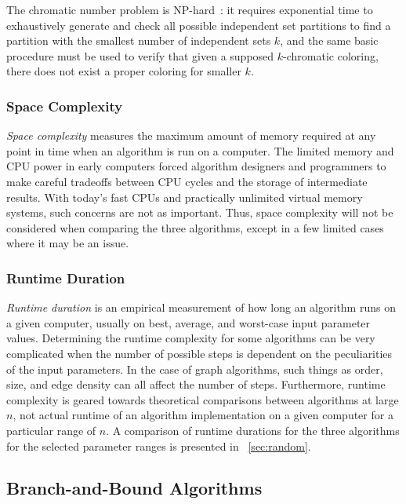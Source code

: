 The chromatic number problem is NP-hard~\cite{mcdiarmid}: it requires exponential time to exhaustively generate and
check all possible independent set partitions to find a partition with the smallest number of independent sets
\(k\), and the same basic procedure must be used to verify that given a supposed \(k\)-chromatic coloring, there
does not exist a proper coloring for smaller \(k\).

\subsubsection{Space Complexity}\label{sec:sub:sub:space}

\emph{Space complexity} measures the maximum amount of memory required at any point in time when an algorithm is
run on a computer.  The limited memory and CPU power in early computers forced algorithm designers and programmers
to make careful tradeoffs between CPU cycles and the storage of intermediate results.  With today's fast CPUs and
practically unlimited virtual memory systems, such concerns are not as important.  Thus, space complexity will not
be considered when comparing the three algorithms, except in a few limited cases where it may be an issue.

\subsubsection{Runtime Duration}\label{sec:sub:sub:duration}

\emph{Runtime duration} is an empirical measurement of how long an algorithm runs on a given computer, usually on
best, average, and worst-case input parameter values.  Determining the runtime complexity for some algorithms can
be very complicated when the number of possible steps is dependent on the peculiarities of the input parameters.
In the case of graph algorithms, such things as order, size, and edge density can all affect the number of steps.
Furthermore, runtime complexity is geared towards theoretical comparisons between algorithms at large \(n\), not
actual runtime of an algorithm implementation on a given computer for a particular range of \(n\).  A comparison of
runtime durations for the three algorithms for the selected parameter ranges is presented in
\sectionname~\ref{sec:random}.

\subsection{Branch-and-Bound Algorithms}\label{sec:sub:bandb}

